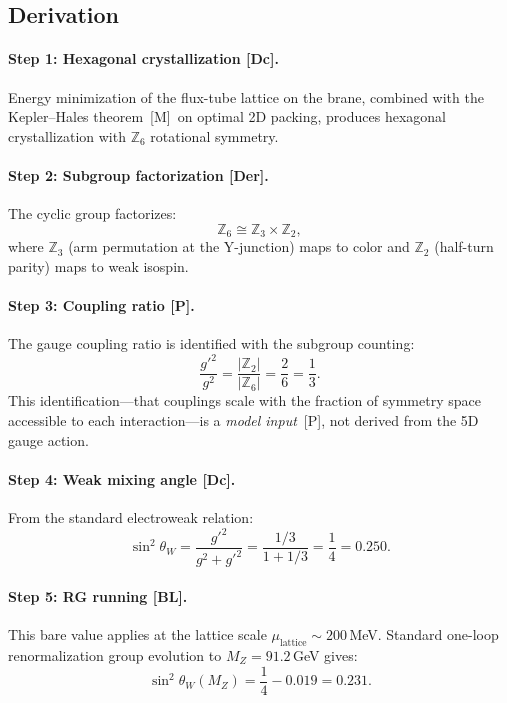 \documentclass[12pt,a4paper]{article}
\theoremstyle{definition}
\theoremstyle{remark}
\newcommand{\tagDer}{\textsf{[Der]}}
\newcommand{\tagDc}{\textsf{[Dc]}}
\newcommand{\tagP}{\textsf{[P]}}
\newcommand{\tagBL}{\textsf{[BL]}}
\newcommand{\tagM}{\textsf{[M]}}
\newcommand{\stw}{\sin^2\!\theta_W}
\newcommand{\Zn}[1]{\mathbb{Z}_{#1}}
\begin{document}
\subsection{Derivation}

\paragraph{Step 1: Hexagonal crystallization \tagDc.}
Energy minimization of the flux-tube lattice on the brane, combined
with the Kepler--Hales theorem~\tagM\ on optimal 2D packing, produces
hexagonal crystallization with $\Zn{6}$ rotational symmetry.

\paragraph{Step 2: Subgroup factorization \tagDer.}
The cyclic group factorizes:
\begin{equation}
  \Zn{6} \cong \Zn{3} \times \Zn{2},
  \label{eq:Z6}
\end{equation}
where $\Zn{3}$ (arm permutation at the Y-junction) maps to color
and $\Zn{2}$ (half-turn parity) maps to weak isospin.

\paragraph{Step 3: Coupling ratio \tagP.}
The gauge coupling ratio is identified with the subgroup counting:
\begin{equation}
  \frac{g'^2}{g^2} = \frac{|\Zn{2}|}{|\Zn{6}|} = \frac{2}{6}
    = \frac{1}{3}.
  \label{eq:coupling-ratio}
\end{equation}
This identification---that couplings scale with the fraction of
symmetry space accessible to each interaction---is a \emph{model
input}~\tagP, not derived from the 5D gauge action.

\paragraph{Step 4: Weak mixing angle \tagDc.}
From the standard electroweak relation:
\begin{equation}
  \stw = \frac{g'^2}{g^2 + g'^2}
       = \frac{1/3}{1 + 1/3}
       = \frac{1}{4}
       = 0.250.
  \label{eq:sin2tw}
\end{equation}

\paragraph{Step 5: RG running \tagBL.}
This bare value applies at the lattice scale
$\mu_{\mathrm{lattice}} \sim 200$\,MeV.  Standard one-loop
renormalization group evolution to $M_Z = 91.2$\,GeV gives:
\begin{equation}
  \stw(M_Z) = \frac{1}{4} - 0.019 = 0.231.
  \label{eq:sin2tw-MZ}
\end{equation}
\end{document}
